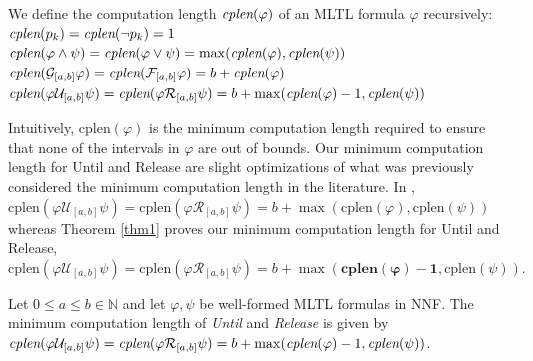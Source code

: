 \documentclass[runningheads]{llncs}
\renewcommand{\phi}{\varphi}
\begin{document}
\begin{definition}
We define the computation length $\emph{cplen}(\phi)$ of an MLTL formula $\phi$ recursively:\\
\indent \qquad   $\emph{cplen}(p_k) = \emph{cplen}(\neg p_k) = 1$\\
\indent \qquad   $\emph{cplen}(\phi \land \psi) = \emph{cplen}(\phi \lor \psi) = \max(\emph{cplen}(\phi), \emph{cplen}(\psi))$\\
\indent \qquad   $\emph{cplen}(\mathcal{G}_{[a,b]} \phi) = \emph{cplen}(\mathcal{F}_{[a,b]} \phi) = b + \emph{cplen}(\phi)$\\
\indent \qquad   $\emph{cplen}(\phi \mathcal{U}_{[a,b]} \psi) = \emph{cplen}(\phi \mathcal{R}_{[a,b]} \psi) = b + \max(\emph{cplen}(\phi)-1, \emph{cplen}(\psi))$
\end{definition}
\vspace{-0.1in}
Intuitively, $\text{cplen}(\phi)$ is the minimum computation length required to ensure that none of the intervals in $\phi$ are out of bounds.
Our minimum computation length for Until and Release are slight optimizations of what was previously considered the minimum computation length in the literature. In \cite{KZJZR20},\\
\indent $\text{cplen}(\phi \mathcal{U}_{[a,b]} \psi) = \text{cplen}(\phi \mathcal{R}_{[a,b]} \psi) = b + \max(\text{cplen}(\phi), \text{cplen}(\psi))$ \\ 
\noindent whereas Theorem \ref{thm1} proves our minimum computation length for Until and Release, \\
\indent $\text{cplen}(\phi \mathcal{U}_{[a,b]} \psi) = \text{cplen}(\phi \mathcal{R}_{[a,b]} \psi) = b + \max(\mathbf{\text{cplen}(\phi)-1}, \text{cplen}(\psi)).$
\begin{theorem}\label{thm1}
    Let $0 \leq a\leq b \in \mathbb{N}$ and let $\phi, \psi$ be well-formed MLTL formulas in NNF. The minimum computation length of \emph{Until} and \emph{Release} is given by $\emph{cplen}(\phi \mathcal{U}_{[a,b]} \psi) = \emph{cplen}(\phi \mathcal{R}_{[a,b]} \psi) = b + \max(\emph{cplen}(\phi)-1, \emph{cplen}(\psi))$.
\end{theorem}
\end{document}
